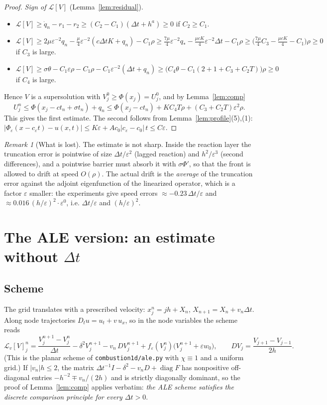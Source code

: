 \documentclass[11pt]{amsart}
\theoremstyle{remark}
\newtheorem{remark}[theorem]{Remark}
\newcommand{\ve}{\varepsilon}
\newcommand{\Lop}{\mathcal{L}}
\begin{document}
\begin{proof}
\emph{Sign of $\Lop[V]$} (Lemma~\ref{lem:residual}).
\begin{itemize}
\item[(I)] $\Lop[V]\ge\dot q_n-r_1-r_2\ge(C_2-C_1)(\Delta t+h^a)\ge0$ if $C_2\ge C_1$.
\item[(III)] $\Lop[V]\ge2\mu\ve^{-2}q_n-\frac\mu4\ve^{-2}(c\Delta tK+q_n)-C_1\rho
\ge\frac{7\mu}4\ve^{-2}q_*-\frac{\mu cK}{4}\ve^{-2}\Delta t-C_1\rho
\ge\big(\tfrac{7\mu}{4}C_3-\tfrac{\mu cK}{4}-C_1\big)\rho\ge0$ if $C_3$ is large.
\item[(II)] $\Lop[V]\ge\sigma\theta-C_1\ve\rho-C_1\rho-C_1\ve^{-2}(\Delta t+q_n)
\ge\big(C_4\theta-C_1(2+1+C_3+C_2T)\big)\rho\ge0$ if $C_4$ is large.
\end{itemize}
Hence $V$ is a supersolution with $V^0_j\ge\Phi(x_j)=U^0_j$, and by
Lemma~\ref{lem:comp}
\[
U^n_j\le\Phi(x_j-ct_n+\sigma t_n)+q_n\le\Phi(x_j-ct_n)+KC_4T\rho+(C_3+C_2T)\ve^2\rho .
\]
This gives the first estimate. The second follows from
Lemma~\ref{lem:profile}(5),(1): $|\Phi_\ve(x-c_\ve t)-u(x,t)|\le K\ve+Ac_0|c_\ve-c_0|\,t\le C\ve$.
\end{proof}

\begin{remark}[What is lost]
The estimate is not sharp. Inside the reaction layer the truncation error is
pointwise of size $\Delta t/\ve^2$ (lagged reaction) and $h^2/\ve^3$
(second differences), and a pointwise barrier must absorb it with
$\sigma\Phi'$, so that the front is allowed to drift at speed $O(\rho)$.
The actual drift is the \emph{average} of the truncation error against the
adjoint eigenfunction of the linearized operator, which is a factor $\ve$
smaller: the experiments give speed errors $\approx-0.23\,\Delta t/\ve$ and
$\approx0.016\,(h/\ve)^2\cdot\ve^0$, i.e. $\Delta t/\ve$ and $(h/\ve)^2$.
\end{remark}


\section{The ALE version: an estimate without $\Delta t$}\label{sec:ale}

\subsection*{Scheme}
The grid translates with a prescribed velocity: $x^n_j=jh+X_n$,
$X_{n+1}=X_n+v_n\Delta t$. Along node trajectories $D_tu=u_t+v\,u_x$, so in the
node variables the scheme reads
\begin{equation}\label{eq:Lv}
\Lop_v[V]^n_j=\frac{V^{n+1}_j-V^n_j}{\Delta t}-\delta^2V^{n+1}_j-v_n\,DV^{n+1}_j
+f_\ve(V^n_j)\big(V^{n+1}_j+\ve w_0\big),\qquad DV_j=\frac{V_{j+1}-V_{j-1}}{2h}.
\end{equation}
(This is the planar scheme of \texttt{combustion1d/ale.py} with $\chi\equiv1$ and
a uniform grid.) If $|v_n|h\le2$, the matrix
$\Delta t^{-1}I-\delta^2-v_nD+\operatorname{diag}F$ has nonpositive
off-diagonal entries $-h^{-2}\mp v_n/(2h)$ and is strictly diagonally
dominant, so the proof of Lemma~\ref{lem:comp} applies verbatim:
\emph{the ALE scheme satisfies the discrete comparison principle for every
$\Delta t>0$}.
\end{document}
